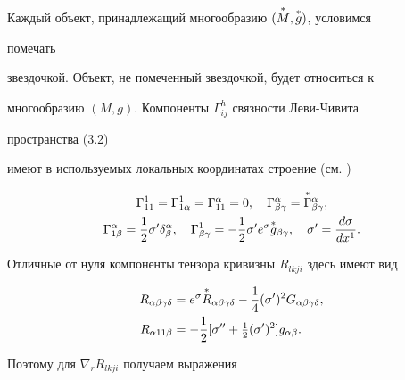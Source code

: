  


Каждый объект, принадлежащий многообразию $(\overset{*}{M}{},\overset{*}{g}{})$, условимся 


помечать 


звездочкой. Объект, не помеченный звездочкой, будет относиться к 


многообразию $(M,g)$. Компоненты $\Gamma^h_{ij}$ связности Леви-Чивита 


пространства (3.2) 


имеют в используемых локальных координатах строение (см. \cite{16}) 


\begin{gather*} 


\Gamma^1_{11}=\Gamma^1_{1\alpha}=\Gamma^\alpha_{11}=0,\quad 


\Gamma^\alpha_{\beta\gamma}=\up{\Gamma}^\alpha_{\beta\gamma},\\ 


\Gamma^\alpha_{1\beta}=\frac{1}{2}\sigma'\delta^\alpha_\beta, 


\quad \Gamma^1_{\beta\gamma}=-\frac{1}{2} 


\sigma'e^\sigma\up{g}_{\beta\gamma},\quad 


\sigma'=\frac{d\sigma}{dx^1}. 


\end{gather*} 


Отличные от нуля компоненты тензора кривизны $R_{lkji}$ здесь имеют вид 


\begin{equation} 


\begin{split} 


R_{\alpha\beta\gamma\delta}&= 


e^\sigma\up{R}_{\alpha\beta\gamma\delta}-\frac{1}{4} 


(\sigma')^2G_{\alpha\beta\gamma\delta},\\ 


R_{\alpha 11\beta}&=-\frac{1}{2}[\sigma''+\tfrac{1}{2} 


(\sigma')^2]g_{\alpha\beta}. 


\end{split} 


\end{equation} 


Поэтому для $\nabla_r R_{lkji}$ получаем выражения 



